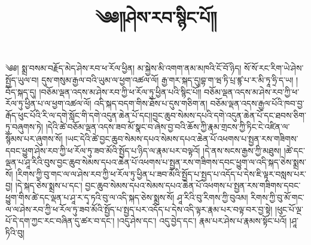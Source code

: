 

\nonfrenchspacing
\raggedright
\title{\LARGE ༄༅༎ཤེས་རབ་སྙིང་པོ༎}
\maketitle
{}
\Large
༄༅། སྨྲ་བསམ་བརྗོད་མེད་ཤེས་རབ་ཕ་རོལ་ཕྱིན། མ་སྐྱེས་མི་འགག་ནམ་མཁའི་ངོ་བོ་ཉིད།
སོ་སོ་རང་རིག་ཡེ་ཤེས་སྤྱོད་ཡུལ་བ། དུས་གསུམ་རྒྱལ་བའི་ཡུམ་ལ་ཕྱག་འཚལ་ལོ།
རྒྱ་གར་སྐད་དུ།བྷ་ག་ཝ་ཏི་པྲ་ཛྙ་པ་ར་མི་ཏཱ་ཧྲི་ད་ཡ། །བོད་སྐད་དུ།
།བཅོམ་ལྡན་འདས་མ་ཤེས་རབ་ཀྱི་ཕ་རོལ་ཏུ་ཕྱིན་པའི་སྙིང་པོ༎
བཅོམ་ལྡན་འདས་མ་ཤེས་རབ་ཀྱི་ཕ་རོལ་ཏུ་ཕྱིན་པ་ལ་ཕྱག་འཚལ་ལོ། འདི་སྐད་བདག་གིས་ཐོས་པ་དུས་གཅིག་ན།
བཅོམ་ལྡན་འདས་རྒྱལ་པོའི་ཁབ་བྱ་རྒོད་ཕུང་པོའི་རི་ལ་དགེ་སློང་གི་དགེ་འདུན་ཆེན་པོ་དང།།བྱང་ཆུབ་སེམས་དཔའི་དགེ་འདུན་ཆེན་པོ་དང་ཐབས་ཅིག་ཏུ་བཞུགས་ཏེ།
།དེའི་ཚེ་བཅོམ་ལྡན་འདས་ཟབ་མོ་སྣང་བ་ཞེས་བྱ་བའི་ཆོས་ཀྱི་རྣམ་གྲངས་ཀྱི་ཏིང་ངེ་འཛིན་ལ་སྙོམས་པར་ཞུགས་སོ།
།ཡང་དེའི་ཚེ་བྱང་ཆུབ་སེམས་དཔའ་སེམས་དཔའ་ཆེན་པོ་འཕགས་པ་སྤྱན་རས་གཟིགས་དབང་ཕྱུག་ཤེས་རབ་ཀྱི་ཕ་རོལ་ཏུ་ཟབ་མོའི་སྤྱོད་པ་ཉིད་ལ་རྣམ་པར་བལྟའོ།
།དེ་ནས་སངས་རྒྱས་ཀྱི་མཐུས།
།ཚེ་དང་ལྡན་པ་ཤཱ་རིའི་བུས་བྱང་ཆུབ་སེམས་དཔའ་ཆེན་པོ་འཕགས་པ་སྤྱན་རས་གཟིགས་དབང་ཕྱུག་ལ་འདི་སྐད་ཅེས་སྨྲས་སོ།
།རིགས་ཀྱི་བུ་གང་ལ་ལ་ཤེས་རབ་ཀྱི་ཕ་རོལ་ཏུ་ཕྱིན་པ་ཟབ་མོའི་སྤྱོད་པ་སྤྱད་པ་འདོད་པ་དེས་ཇི་ལྟར་བསླས་པར་བྱ།
།དེ་སྐད་ཅེས་སྨྲས་པ་དང་།
བྱང་ཆུབ་སེམས་དཔའ་སེམས་དཔའ་ཆེན་པོ་འཕགས་པ་སྤྱན་རས་གཟིགས་དབང་ཕྱུག་གིས་ཚེ་དང་ལྡན་པ་ཤཱ་ར་དྭ་ཏའི་བུ་ལ་འདི་སྐད་ཅེས་སྨྲས་སོ།
ཤཱ་རིའི་བུ་རིགས་ཀྱི་བུའམ།
རིགས་ཀྱི་བུ་མོ་གང་ལ་ལ་ཤེས་རབ་ཀྱི་ཕ་རོལ་ཏུ་ཟབ་མོའི་སྤྱོད་པ་སྤྱད་པར་འདོད་པ་དེས་འདི་ལྟར་རྣམ་པར་བལྟ་བར་བྱ་སྟེ།
།ཕུང་པོ་ལྔ་པོ་དེ་དག་ཀྱང་རང་བཞིན་དུ་ཚར་བ་དང་།
།འདུ་ཤེས་དང་།
འདུ་བྱེད་དང་།
རྣམ་པར་ཤེས་པ་རྣམས་སྟོང་པའོ།
།ཤཱ་ཏིའི་བུ།

